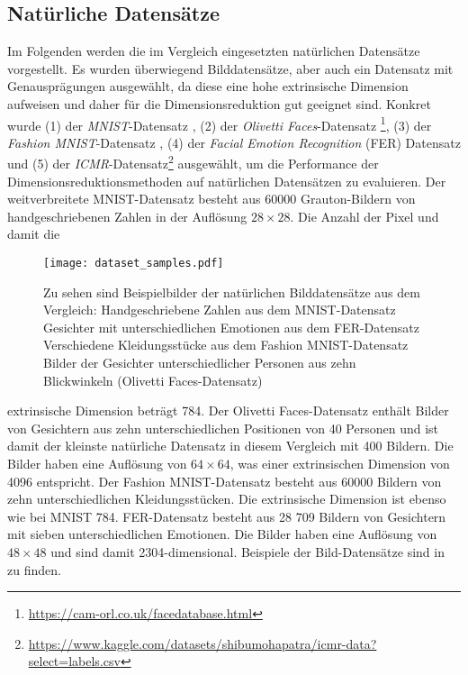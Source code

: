 \subsection{Natürliche Datensätze}
\label{ch:Vergleich:sec:VerwendeteDatensaetze:natuerlich}
Im Folgenden werden die im Vergleich eingesetzten natürlichen Datensätze vorgestellt. Es wurden überwiegend Bilddatensätze, aber auch ein Datensatz mit Genausprägungen ausgewählt, da diese eine
hohe extrinsische Dimension aufweisen und daher für die Dimensionsreduktion gut geeignet sind.
Konkret wurde (1) der \textit{MNIST}-Datensatz \parencite{LeCun.2010}, (2) der \textit{Olivetti Faces}-Datensatz
\footnote{\url{https://cam-orl.co.uk/facedatabase.html}}, (3) der \textit{Fashion MNIST}-Datensatz \parencite{Xiao.2017}, (4) der \textit{Facial Emotion Recognition} (FER) Datensatz \parencite{DumitruIanGoodfellowWillCukierskiYoshuaBengio.2013} und (5) der
\textit{ICMR}-Datensatz\footnote{\url{https://www.kaggle.com/datasets/shibumohapatra/icmr-data?select=labels.csv}}
ausgewählt, um die Performance der Dimensionsreduktionsmethoden auf natürlichen Datensätzen zu
evaluieren. Der weitverbreitete MNIST-Datensatz besteht aus \num{60000} Grauton-Bildern von
handgeschriebenen Zahlen in der Auflösung $28 \times 28$. Die Anzahl der Pixel und damit die
\begin{figure}[h]
	\begin{center}
		\texttt{[image: dataset\_samples.pdf]}
	\end{center}
	\caption[Beispielbilder der natürlichen Datensätze]{Zu sehen sind Beispielbilder der natürlichen Bilddatensätze aus dem Vergleich: \captiona Handgeschriebene Zahlen aus dem MNIST-Datensatz \captionb Gesichter mit unterschiedlichen Emotionen aus dem FER-Datensatz \captionc Verschiedene Kleidungsstücke aus dem Fashion MNIST-Datensatz \captiond Bilder der Gesichter unterschiedlicher Personen aus zehn Blickwinkeln (Olivetti Faces-Datensatz)}
	\label{fig:Dataset_samples}
\end{figure}
extrinsische Dimension beträgt 784. Der Olivetti Faces-Datensatz enthält Bilder von Gesichtern aus
zehn unterschiedlichen Positionen von 40 Personen und ist damit der kleinste natürliche Datensatz
in diesem Vergleich mit 400 Bildern. Die Bilder haben eine Auflösung von $64 \times 64$, was einer
extrinsischen Dimension von \num{4096} entspricht. Der Fashion MNIST-Datensatz besteht aus \num{60000} Bildern
von zehn unterschiedlichen Kleidungsstücken. Die extrinsische Dimension ist ebenso wie bei MNIST
784. FER-Datensatz besteht aus 28 709 Bildern von Gesichtern mit sieben unterschiedlichen
Emotionen. Die Bilder haben eine Auflösung von $48 \times 48$ und sind damit \num{2304}-dimensional.
Beispiele der Bild-Datensätze sind in  zu finden.

